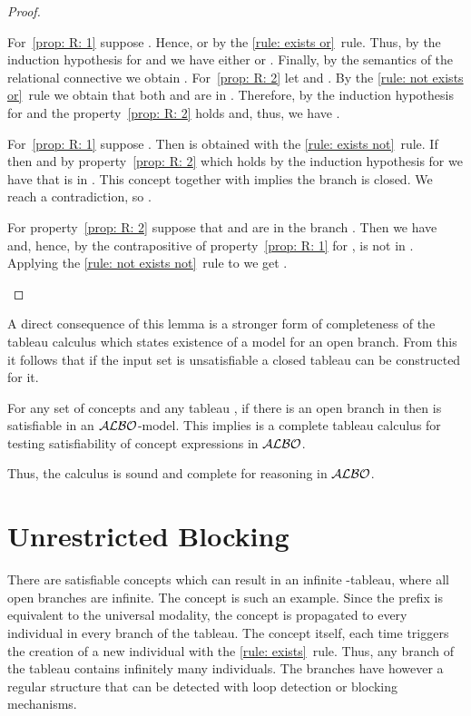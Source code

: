 \documentclass[leqno
,pdflatex
,prodmode
,acmtocl
]{acmsmall}
\newcommand{\mathcmd}[1]{\ensuremath{#1}\xspace}
\newcommand{\dlfont}{\mathcal}
\newcommand{\dl}[1]{\mathcmd{\dlfont{#1}}}
\newcommand{\ALBOid}{\dl{ALBO\smash[t]{\mbox{}}}}
\begin{document}
\begin{proof}
\begin{description}
    For~\eqref{prop: R: 1} suppose .
    Hence,  or 
    by the \eqref{rule: exists or}~rule.
    Thus, by the induction hypothesis for  and  we have
    either  or .
    Finally, by the semantics of the relational  connective we obtain
    .
For~\eqref{prop: R: 2} let 
        and .
    By the \eqref{rule: not exists or}~rule we obtain that both
         and  are in .
    Therefore, by the induction hypothesis for  and  the property~\eqref{prop: R: 2} holds
    and, thus, we have .
 \item[] For~\eqref{prop: R: 1} suppose . 
    Then  is obtained with the \eqref{rule: exists not}~rule. 
    If 
    then  and by property~\eqref{prop: R: 2} which holds
    by the induction hypothesis for  we have that
     is in . This concept together with  implies
    the branch is closed. We reach a contradiction, so .

    For property~\eqref{prop: R: 2} suppose that 
    and  are in the branch .
    Then we have  and, hence,
    by the contrapositive of property~\eqref{prop: R: 1} for ,
     is not in .
    Applying the 
    \eqref{rule: not exists not}~rule to  we
get
    .
\end{description}
\end{proof}
A direct consequence of this lemma is a stronger form of completeness
of the tableau calculus which states existence of a model for an open
branch.
From this it follows that if the input set is unsatisfiable a closed tableau
can be constructed for it.
\begin{theorem}
[Completeness]\label{theorem: completeness} For any set of concepts
 and any tableau , if there
is an open branch in  then 
is satisfiable in an \ALBOid-model.
This implies
 is a complete tableau calculus for testing satisfiability
of concept expressions in \ALBOid.
\end{theorem}
Thus, the calculus  is sound and complete for reasoning in \ALBOid.

\section{Unrestricted Blocking}
\label{section_blocking}

There are satisfiable concepts which can result in an infinite
-tableau, where all open branches are infinite.
The concept  is such an
example. 
Since the prefix 
 is equivalent to the universal modality,
the concept  is propagated to every
individual  in every branch of the tableau.
The concept  itself, each time triggers the creation
of a new individual with the \eqref{rule: exists}~rule.
Thus, any branch of the tableau contains infinitely
many individuals. The branches
have however a regular structure that can be detected with loop
detection or blocking mechanisms.
\end{document}
